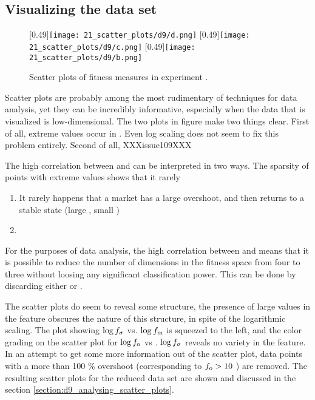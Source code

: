 \subsection{Visualizing the data set}
\begin{figure}
\centering
{}
[0.49\linewidth]{\texttt{[image: 21\_scatter\_plots/d9/d.png]}}
[0.49\linewidth]{\texttt{[image: 21\_scatter\_plots/d9/c.png]}}
[0.49\linewidth]{\texttt{[image: 21\_scatter\_plots/d9/b.png]}}
\caption{Scatter plots of fitness measures in experiment \dnine. }
\label{figure:d9_scatter_fitness}
\end{figure}

Scatter plots are probably among the most rudimentary of techniques for data analysis, yet they can be incredibly informative, especially when the data that is visualized is low-dimensional.
The two plots in figure make two things clear. First of all, extreme values occur in \stdev. Even log scaling does not seem to fix this problem entirely. Second of all, XXXissue109XXX

The high correlation between \stdev and \overshoot can be interpreted in two ways. 
The sparsity of points with extreme values shows that it rarely


\begin{enumerate}
\item It rarely happens that a market has a large overshoot, and then returns to a stable state (large \overshoot, small \stdev)
\item 
\end{enumerate}

For the purposes of data analysis, the high correlation between \stdev and \overshoot means that it is possible to reduce the number of dimensions in the fitness space from four to three without loosing any significant classification power. This can be done by discarding either \stdev or \overshoot. %

The scatter plots do seem to reveal some structure, the presence of large values in the \stdev feature obscures the nature of this structure, in spite of the logarithmic scaling. The plot showing $\log f_\sigma$ vs. $\log f_\text{m}$ is squeezed to the left, and the color grading on the scatter plot for $\log f_\text{o}$ vs . $\log f_\sigma$ reveals no variety in the \stdev feature. In an attempt to get some more information out of the scatter plot, data points with a more than 100 \% overshoot (corresponding to $f_\text{o} > 10$ ) are removed. The resulting scatter plots for the reduced data set are shown and discussed in the section \ref{section:d9_analysing_scatter_plots}.

